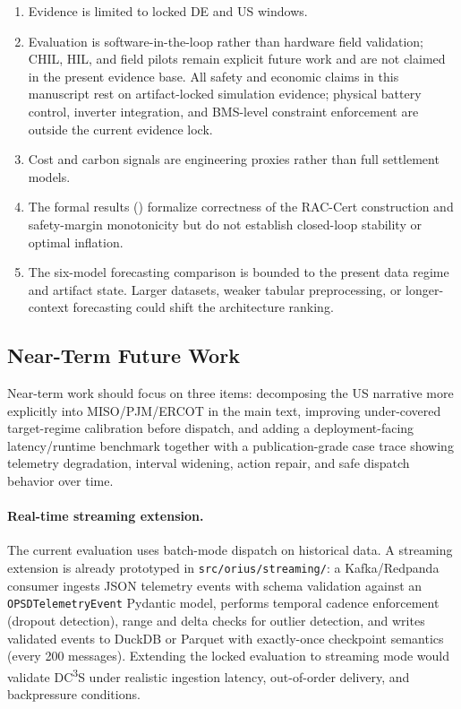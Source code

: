\documentclass[11pt,a4paper]{article}
\begin{document}
\begin{enumerate}[leftmargin=*,topsep=2pt,itemsep=1pt]
  \item Evidence is limited to locked DE and US windows.
  \item Evaluation is software-in-the-loop rather than hardware field validation; CHIL, HIL, and field pilots remain explicit future work and are not claimed in the present evidence base. All safety and economic claims in this manuscript rest on artifact-locked simulation evidence; physical battery control, inverter integration, and BMS-level constraint enforcement are outside the current evidence lock.
  \item Cost and carbon signals are engineering proxies rather than full settlement models.
  \item The formal results () formalize correctness of the RAC-Cert construction and safety-margin monotonicity but do not establish closed-loop stability or optimal inflation.
  \item The six-model forecasting comparison is bounded to the present data regime and artifact state. Larger datasets, weaker tabular preprocessing, or longer-context forecasting could shift the architecture ranking.
\end{enumerate}

\subsection{Near-Term Future Work}

Near-term work should focus on three items: decomposing the US narrative more explicitly into MISO/PJM/ERCOT in the main text, improving under-covered target-regime calibration before dispatch, and adding a deployment-facing latency/runtime benchmark together with a publication-grade case trace showing telemetry degradation, interval widening, action repair, and safe dispatch behavior over time.

\paragraph{Real-time streaming extension.}
The current evaluation uses batch-mode dispatch on historical data. A streaming extension is already prototyped in \texttt{src/orius/streaming/}: a Kafka/Redpanda consumer ingests JSON telemetry events with schema validation against an \texttt{OPSDTelemetryEvent} Pydantic model, performs temporal cadence enforcement (dropout detection), range and delta checks for outlier detection, and writes validated events to DuckDB or Parquet with exactly-once checkpoint semantics (every 200 messages). Extending the locked evaluation to streaming mode would validate DC\textsuperscript{3}S under realistic ingestion latency, out-of-order delivery, and backpressure conditions.
\end{document}
